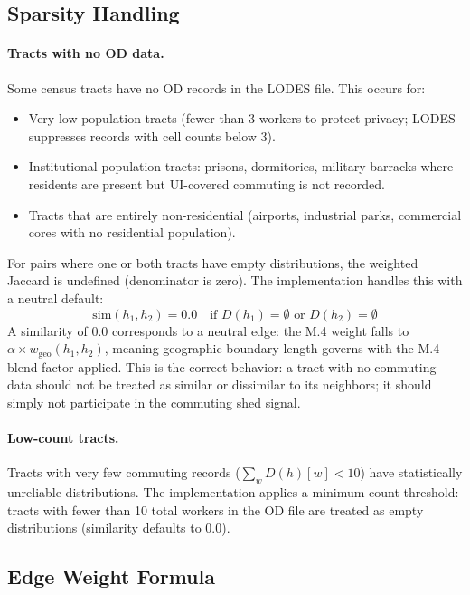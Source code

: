 \subsection{Sparsity Handling}

\paragraph{Tracts with no OD data.}
Some census tracts have no OD records in the LODES file.
This occurs for:
\begin{itemize}
  \item Very low-population tracts (fewer than 3 workers to protect privacy;
    LODES suppresses records with cell counts below 3).
  \item Institutional population tracts: prisons, dormitories, military
    barracks where residents are present but UI-covered commuting is not
    recorded.
  \item Tracts that are entirely non-residential (airports, industrial parks,
    commercial cores with no residential population).
\end{itemize}
For pairs where one or both tracts have empty distributions, the weighted
Jaccard is undefined (denominator is zero).
The implementation handles this with a neutral default:
\begin{equation}
  \mathrm{sim}(h_1, h_2) = 0.0 \quad \text{if } D(h_1) = \emptyset \text{ or } D(h_2) = \emptyset
  \label{eq:sparsity}
\end{equation}
A similarity of 0.0 corresponds to a neutral edge: the M.4 weight falls to
$\alpha \times w_{\mathrm{geo}}(h_1, h_2)$, meaning geographic boundary
length governs with the M.4 blend factor applied.
This is the correct behavior: a tract with no commuting data should not be
treated as similar or dissimilar to its neighbors; it should simply not
participate in the commuting shed signal.

\paragraph{Low-count tracts.}
Tracts with very few commuting records ($\sum_w D(h)[w] < 10$) have
statistically unreliable distributions.
The implementation applies a minimum count threshold: tracts with fewer
than 10 total workers in the OD file are treated as empty distributions
(similarity defaults to 0.0).

\subsection{Edge Weight Formula}

